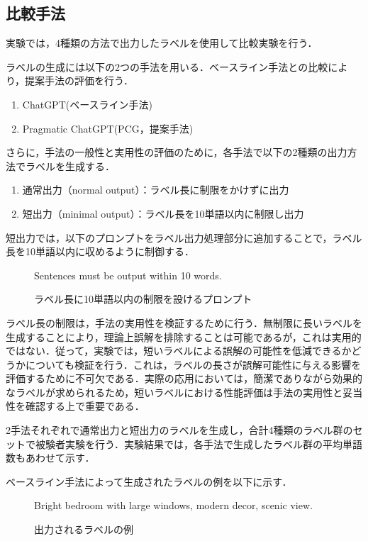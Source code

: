 \documentclass[a4paper,11pt]{jreport}
\begin{document}
\subsection{比較手法}

実験では，4種類の方法で出力したラベルを使用して比較実験を行う．

ラベルの生成には以下の2つの手法を用いる．ベースライン手法との比較により，提案手法の評価を行う．
\begin{enumerate}
    \item ChatGPT(ベースライン手法)
    \item Pragmatic ChatGPT(PCG，提案手法)
\end{enumerate}

さらに，手法の一般性と実用性の評価のために，各手法で以下の2種類の出力方法でラベルを生成する．
\begin{enumerate}
  \item 通常出力（normal output）：ラベル長に制限をかけずに出力
  \item 短出力（minimal output）：ラベル長を10単語以内に制限し出力
\end{enumerate}

短出力では，以下のプロンプトをラベル出力処理部分に追加することで，ラベル長を10単語以内に収めるように制御する．

\begin{figure}[H]
\begin{mdframed}[linewidth=1pt]
Sentences must be output within 10 words.
\end{mdframed}
\caption{ラベル長に10単語以内の制限を設けるプロンプト}
\label{fig:limiting_prompt}
\end{figure}


ラベル長の制限は，手法の実用性を検証するために行う．無制限に長いラベルを生成することにより，理論上誤解を排除することは可能であるが，これは実用的ではない．従って，実験では，短いラベルによる誤解の可能性を低減できるかどうかについても検証を行う．これは，ラベルの長さが誤解可能性に与える影響を評価するために不可欠である．実際の応用においては，簡潔でありながら効果的なラベルが求められるため，短いラベルにおける性能評価は手法の実用性と妥当性を確認する上で重要である．

2手法それぞれで通常出力と短出力のラベルを生成し，合計4種類のラベル群のセットで被験者実験を行う．実験結果では，各手法で生成したラベル群の平均単語数もあわせて示す．

ベースライン手法によって生成されたラベルの例を以下に示す．

\begin{figure}[H]
\begin{mdframed}[linewidth=1pt]
Bright bedroom with large windows, modern decor, scenic view.
\end{mdframed}
\caption{出力されるラベルの例}
\label{fig:label_example}
\end{figure}
\end{document}
